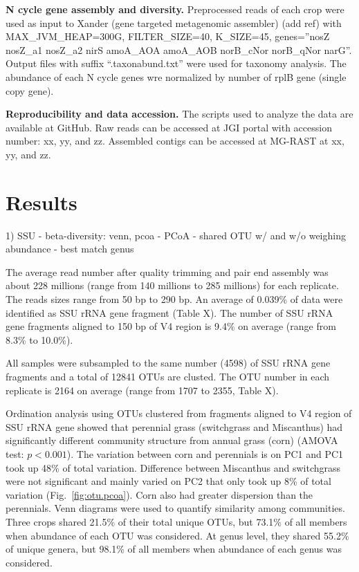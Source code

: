 \documentclass[12pt]{article}
\begin{document}
{\bf N cycle gene assembly and diversity.}
Preprocessed reads of each crop were used as input to Xander (gene targeted metagenomic assembler) (add ref) with MAX\_JVM\_HEAP=300G, FILTER\_SIZE=40, K\_SIZE=45, genes=''nosZ nosZ\_a1 nosZ\_a2 nirS amoA\_AOA amoA\_AOB norB\_cNor norB\_qNor narG''. Output files with suffix ``.taxonabund.txt'' were used for taxonomy analysis. The abundance of each N cycle genes wre normalized by number of rplB gene (single copy gene).

{\bf Reproducibility and data accession.}
The scripts used to analyze the data are available at GitHub. Raw reads can be accessed at JGI portal with accession number: xx, yy, and zz. Assembled contigs can be accessed at MG-RAST at xx, yy, and zz.

\section{Results}

1) SSU
- beta-diversity: venn, pcoa
  - PCoA
  - shared OTU w/ and w/o weighing abundance
  - best match genus

The average read number after quality trimming and pair end assembly was about 228 millions (range from 140 millions to 285 millions) for each replicate. The reads sizes range from 50 bp to 290 bp. An average of 0.039\% of data were identified as SSU rRNA gene fragment (Table X). The number of SSU rRNA gene fragments aligned to 150 bp of V4 region is 9.4\% on average (range from 8.3\% to 10.0\%).

All samples were subsampled to the same number (4598) of SSU rRNA gene fragments and a total of 12841 OTUs are clusted. The OTU number in each replicate is 2164 on average (range from 1707 to 2355, Table X).

Ordination analysis using OTUs clustered from fragments aligned to V4 region of SSU rRNA gene showed that perennial grass (switchgrass and Miscanthus) had significantly different community structure from annual grass (corn) (AMOVA test: $p < 0.001$). The variation between corn and perennials is on PC1 and PC1 took up 48\% of total variation. Difference between Miscanthus and switchgrass were not significant and mainly varied on PC2 that only took up 8\% of total variation (Fig.~\ref{fig:otu.pcoa}). Corn also had greater dispersion than the perennials. Venn diagrams were used to quantify similarity among communities. Three crops shared 21.5\% of their total unique OTUs, but 73.1\% of all members when abundance of each OTU was considered. At genus level, they shared 55.2\% of unique genera, but 98.1\% of all members when abundance of each genus was considered.
\end{document}
